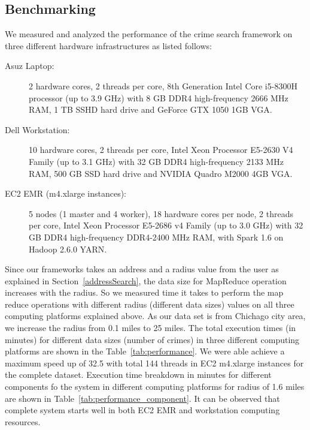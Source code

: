 \subsection{Benchmarking}
We measured and analyzed the performance of the crime search framework
on three different hardware infrastructures as listed follows:
\begin{description}
	\item[Asuz Laptop:] 2 hardware cores, 2 threads per core, 8th
	Generation Intel Core i5-8300H processor (up to 3.9 GHz) with
	8 GB DDR4 high-frequency 2666 MHz RAM, 1 TB SSHD hard drive
	and GeForce GTX 1050 1GB VGA.
        \item[Dell Workstation:] 10
	hardware cores, 2 threads per core, Intel Xeon Processor
	E5-2630 V4 Family (up to 3.1 GHz) with 32 GB DDR4
	high-frequency 2133 MHz RAM, 500 GB SSD hard drive and NVIDIA
	Quadro M2000 4GB VGA.
        \item[EC2 EMR (m4.xlarge instances):] 5
	nodes (1 master and 4 worker), 18 hardware cores per node, 2
	threads per core, Intel Xeon Processor E5-2686 v4 Family (up
	to 3.0 GHz) with 32 GB DDR4 high-frequency DDR4-2400 MHz RAM,
	with Spark 1.6 on Hadoop 2.6.0 YARN.
\end{description}

Since our frameworks takes an address and a radius value from the user
as explained in Section~\ref{addressSearch}, the data size for
MapReduce operation increases with the radius. So we measured time it
takes to perform the map reduce operations with different radius
(different data sizes) values on all three computing platforms
explained above. As our data set is from Chichago city area, we
increase the radius from 0.1 miles to 25 miles. The total execution
times (in minutes) for different data sizes (number of crimes) in
three different computing platforms are shown in the
Table~\ref{tab:performance}. We were able achieve a maximum speed up
of 32.5 with total 144 threads in EC2 m4.xlarge instances for the
complete dataset. Execution time breakdown in minutes for different
components fo the system in different computing platforms for radius
of 1.6 miles are shown in Table~\ref{tab:performance_component}. It
can be observed that complete system starts well in both EC2 EMR and
workstation computing resources.

